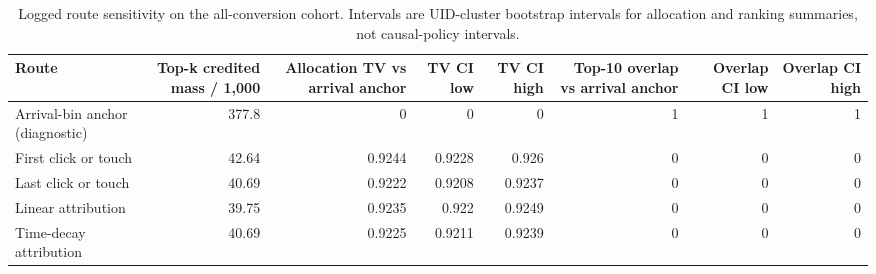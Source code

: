 \begin{table}
\caption{Logged route sensitivity on the all-conversion cohort. Intervals are UID-cluster bootstrap intervals for allocation and ranking summaries, not causal-policy intervals.}
\label{tab:exp2_route_sensitivity}
\begin{tabular}{lrrrrrrr}
\toprule
Route & Top-k credited mass / 1,000 & Allocation TV vs arrival anchor & TV CI low & TV CI high & Top-10 overlap vs arrival anchor & Overlap CI low & Overlap CI high \\
\midrule
Arrival-bin anchor (diagnostic) & 377.8 & 0 & 0 & 0 & 1 & 1 & 1 \\
First click or touch & 42.64 & 0.9244 & 0.9228 & 0.926 & 0 & 0 & 0 \\
Last click or touch & 40.69 & 0.9222 & 0.9208 & 0.9237 & 0 & 0 & 0 \\
Linear attribution & 39.75 & 0.9235 & 0.922 & 0.9249 & 0 & 0 & 0 \\
Time-decay attribution & 40.69 & 0.9225 & 0.9211 & 0.9239 & 0 & 0 & 0 \\
\bottomrule
\end{tabular}
\end{table}
